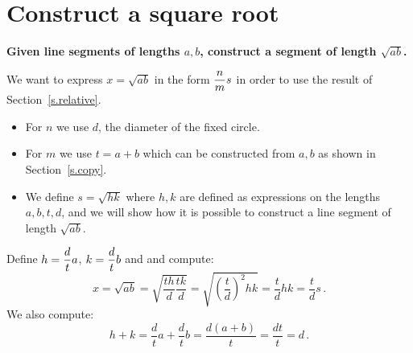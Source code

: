 \section{Construct a square root}\label{s.root}

\textbf{Given line segments of lengths $a,b$, construct a segment of length $\sqrt{ab}$.}

We want to express $x=\sqrt{ab}$ in the form $\displaystyle\frac{n}{m}s$ in order to use the result of Section~\ref{s.relative}.
\begin{itemize}
\setlength{\itemsep}{0pt}
\item For $n$ we use $d$, the diameter of the fixed circle.
\item For $m$ we use $t=a+b$ which can be constructed from $a,b$ as shown in Section~\ref{s.copy}.
\item We define $s=\sqrt{hk}$ where $h,k$ are defined as expressions on the lengths $a,b,t,d$, and we will show how it is possible to construct a line segment of length $\sqrt{ab}$.
\end{itemize}
Define $h=\displaystyle\frac{d}{t}a$, $k=\displaystyle\frac{d}{t}b$ and and compute:
\[
x=\sqrt{ab}=\sqrt{\frac{th}{d}\frac{tk}{d}}=\sqrt{\left(\frac{t}{d}\right)^2hk}=\frac{t}{d}hk=\frac{t}{d}s\,.
\]
We also compute:
\[
h+k = \frac{d}{t}a + \frac{d}{t}b = \frac{d(a+b)}{t} = \frac{dt}{t} = d\,.
\]


